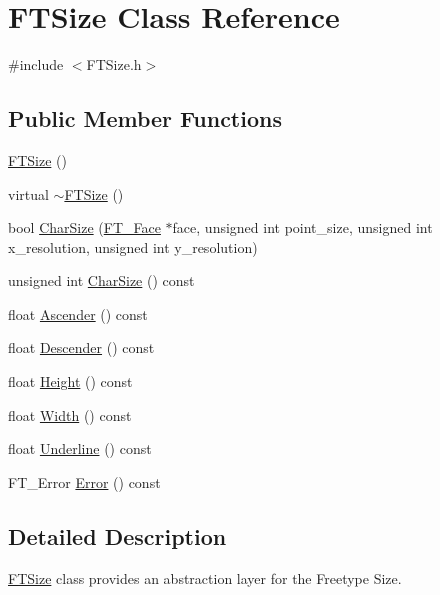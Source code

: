 \hypertarget{class_f_t_size}{\section{F\-T\-Size Class Reference}
\label{class_f_t_size}
}


{\ttfamily \#include $<$F\-T\-Size.\-h$>$}

\subsection*{Public Member Functions}
\begin{DoxyCompactItemize}
\item 
\hyperlink{class_f_t_size_ae1b459031c2ab7fe6ef98530c0251700}{F\-T\-Size} ()
\item 
virtual \hyperlink{class_f_t_size_a7bf23332d879f3e9d76675290012b275}{$\sim$\-F\-T\-Size} ()
\item 
bool \hyperlink{class_f_t_size_a15c6c82655544d1edb101e00e42ffad9}{Char\-Size} (\hyperlink{struct_f_t___face_rec__}{F\-T\-\_\-\-Face} $\ast$face, unsigned int point\-\_\-size, unsigned int x\-\_\-resolution, unsigned int y\-\_\-resolution)
\item 
unsigned int \hyperlink{class_f_t_size_a489fba0a722afd8dfa2a67142cd51767}{Char\-Size} () const 
\item 
float \hyperlink{class_f_t_size_a7865c27cb979feace5ccce2fb544a490}{Ascender} () const 
\item 
float \hyperlink{class_f_t_size_a75c1b86d32c5ea1d296234edb1e4b7ab}{Descender} () const 
\item 
float \hyperlink{class_f_t_size_af0e7398f27936ffe4cbed04c3cfa889d}{Height} () const 
\item 
float \hyperlink{class_f_t_size_a8fe639fa29815a89cdd84138b2564840}{Width} () const 
\item 
float \hyperlink{class_f_t_size_ab85fb58156a855d01b5a4e9e1b91e0e2}{Underline} () const 
\item 
F\-T\-\_\-\-Error \hyperlink{class_f_t_size_a990a2df40c9c1ed06db8d34b2ac3580b}{Error} () const 
\end{DoxyCompactItemize}


\subsection{Detailed Description}
\hyperlink{class_f_t_size}{F\-T\-Size} class provides an abstraction layer for the Freetype Size.

